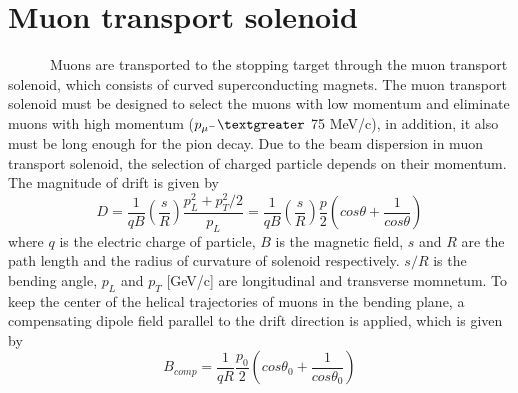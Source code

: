  \section{Muon transport solenoid}
~~~~~~Muons are transported to the stopping target through the muon transport solenoid, which consists of curved superconducting magnets.
The muon transport solenoid must be designed to select the muons with low momentum and eliminate muons with high momentum ($p_{\mu^-} \textgreater$ 75 MeV/c), in addition, it also must be long enough for the pion decay.
Due to the beam dispersion in muon transport solenoid, the selection of charged particle depends on their momentum.
The magnitude of drift is given by
\begin{equation}
 D = \frac{1}{qB}(\frac{s}{R})\frac{p_L^2 + p_T^2/2}{p_L} = \frac{1}{qB}(\frac{s}{R})\frac{p}{2}(cos\theta + \frac{1}{cos\theta})
\end{equation}
where $q$ is the electric charge of particle, $B$ is the magnetic field, $s$ and $R$ are the path length and the radius of curvature of solenoid respectively.
$s/R$ is the bending angle, $p_L$ and $p_T$ [GeV/c] are longitudinal and transverse momnetum.
To keep the center of the helical trajectories of muons in the bending plane, a compensating dipole field parallel to the drift direction is applied, which is given by
\begin{equation}
 B_{comp} = \frac{1}{qR} \frac{p_0}{2} (cos\theta_0 + \frac{1}{cos\theta_0})
\end{equation}

